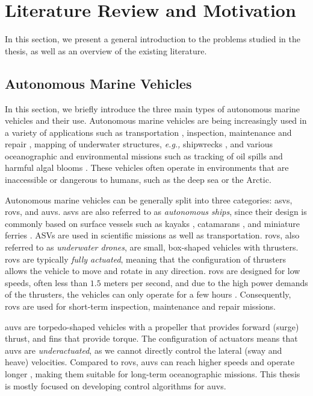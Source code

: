 \section{Literature Review and Motivation}
\label{sec:introduction_literature}

In this section, we present a general introduction to the problems studied in the thesis, as well as an overview of the existing literature.

\subsection{Autonomous Marine Vehicles}

In this section, we briefly introduce the three main types of autonomous marine vehicles and their use.
Autonomous marine vehicles are being increasingly used in a variety of applications such as transportation \cite{pi_transportation_2021,brekke_milliampere_2022}, inspection, maintenance and repair \cite{palomer_inspection_2019,mcleod_inspection_repair_maintenance_2010}, mapping of underwater structures, \emph{e.g.,} shipwrecks \cite{bingham_shipwreck_2010}, and various oceanographic and environmental missions such as tracking of oil spills \cite{petillo_plume_tracking_2012} and harmful algal blooms \cite{robbins_harmful_algae_2006}.
These vehicles often operate in environments that are inaccessible or dangerous to humans, such as the deep sea or the Arctic.

Autonomous marine vehicles can be generally split into three categories: \glspl{asv}, \glspl{rov}, and \glspl{auv}.
\Glspl{asv} are also referred to as \emph{autonomous ships}, since their design is commonly based on surface vessels such as kayaks \cite{kimball_jetkayak_2014}, catamarans \cite{choi_asv_2020,zolich_catamaran_2022}, and miniature ferries \cite{brekke_milliampere_2022}. ASVs are used in scientific missions as well as transportation.
\Glspl{rov}, also referred to as \emph{underwater drones}, are small, box-shaped vehicles with thrusters.
\Glspl{rov} are typically \emph{fully actuated}, meaning that the configuration of thrusters allows the vehicle to move and rotate in any direction.
\Glspl{rov} are designed for low speeds, often less than $1.5$ meters per second, and due to the high power demands of the thrusters, the vehicles can only operate for a few hours \cite{bluerov2}.
Consequently, \glspl{rov} are used for short-term inspection, maintenance and repair missions.

\Glspl{auv} are torpedo-shaped vehicles with a propeller that provides forward (surge) thrust, and fins that provide torque.
The configuration of actuators means that \glspl{auv} are \emph{underactuated}, as we cannot directly control the lateral (sway and heave) velocities.
Compared to \glspl{rov}, \glspl{auv} can reach higher speeds and operate longer \cite{sousa_LAUV_2012,purcell_remus_2000}, making them suitable for long-term oceanographic missions.
This thesis is mostly focused on developing control algorithms for \glspl{auv}.

